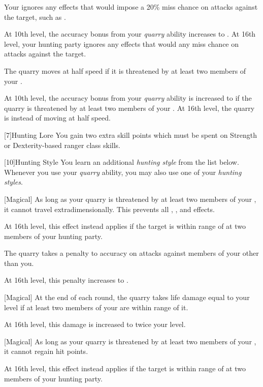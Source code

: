 {            
            Your  ignores any effects that would impose a 20\% miss chance on attacks against the target, such as .

            At 10th level, the accuracy bonus from your \textit{quarry} ability increases to .
            At 16th level, your hunting party ignores any effects that would any miss chance on attacks against the target.

            The quarry moves at half speed if it is threatened by at least two members of your .

            At 10th level, the accuracy bonus from your \textit{quarry} ability is increased to  if the quarry is threatened by at least two members of your .
            At 16th level, the quarry is \immobilized instead of moving at half speed.
        }

        [7]{Hunting Lore} You gain two extra skill points which must be spent on Strength or Dexterity-based ranger class skills.

        [10]{Hunting Style}
        You learn an additional \textit{hunting style} from the list below.
        Whenever you use your \textit{quarry} ability, you may also use one of your \textit{hunting styles}.
        {
            [Magical]
            As long as your quarry is threatened by at least two members of your , it cannot travel extradimensionally.
            This prevents all , , and  effects.

            At 16th level, this effect instead applies if the target is within \rngmed range of at two members of your hunting party.

            The quarry takes a  penalty to accuracy on attacks against members of your  other than you.

            At 16th level, this penalty increases to .

            [Magical]
            At the end of each round, the quarry takes life damage equal to your level if at least two members of your  are within \rngmed range of it.

            At 16th level, this damage is increased to twice your level.

            [Magical]
            As long as your quarry is threatened by at least two members of your , it cannot regain hit points.

            At 16th level, this effect instead applies if the target is within \rngmed range of at two members of your hunting party.
        }

